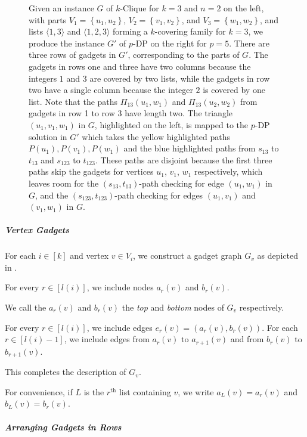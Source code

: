 \documentclass[11pt]{article}
\newcommand{\set}[1]{\left\{#1\right\}}
\theoremstyle{definition}
\begin{document}
\begin{figure}[t]
    \centering
    
    \caption{Given an instance $G$ of \textsf{$k$-Clique} for $k=3$ and $n=2$ on the left, with parts $V_1 = \set{u_1, u_2}$, $V_2 = \set{v_1, v_2}$, and $V_3 = \set{w_1, w_2}$, and lists $\langle 1,3\rangle$ and $\langle 1,2,3\rangle$ 
    forming a $k$-covering family 
    for $k=3$, we produce the instance $G'$ of \textsf{$p$-DP} on the right for $p=5$.
    There are three rows of gadgets in $G'$, corresponding to the  parts of $G$.
    The gadgets in rows one and three have two columns because the  integers $1$ and $3$ are covered by two lists, while the gadgets in row two have 
a single column because the integer $2$ is covered by one list.
Note that the paths $\Pi_{13}(u_1,w_1)$ and $\Pi_{13}(u_2,w_2)$ from gadgets in row 1 to row 3 have length two. 
The triangle $(u_1,v_1,w_1)$ in $G$, highlighted on the left, is mapped to the \textsf{$p$-DP}  solution in $G'$ which takes the yellow highlighted paths $P(u_1), P(v_1), P(w_1)$ and the blue highlighted paths from $s_{13}$ to $t_{13}$ and $s_{123}$ to $t_{123}$.
These paths are disjoint because the first three paths skip the gadgets for vertices $u_1$, $v_1$, $w_1$ respectively, which leaves room for the $(s_{13},t_{13})$-path checking for edge $(u_1,w_1)$ in $G$, and the $(s_{123}, t_{123})$-path checking for edges $(u_1,v_1)$ and $(v_1,w_1)$ in $G$. 
} 
    \label{fig:dp-reduction}
\end{figure}

    \subparagraph{Vertex Gadgets}
    \hfill

    For each $i\in [k]$ and  vertex $v\in V_i$, we construct a gadget graph $G_{v}$ as depicted in .
    
    For every $r\in [l(i)]$, we include nodes $a_r(v)$ and $b_r(v)$.
    
    We call the $a_r(v)$ and $b_r(v)$ the \emph{top} and \emph{bottom} nodes of $G_v$ respectively.
    
    For every $r\in [l(i)]$, we include edges $e_r(v) = (a_r(v), b_r(v))$.
    For each $r\in [l(i)-1]$, we include  edges from $a_r(v)$ to $a_{r+1}(v)$ and from $b_r(v)$ to $b_{r+1}(v)$.
    
    This completes the description of $G_{v}$.
    
    For convenience, if $L$ is the $r^{\text{th}}$ list containing $v$, we write $a_L(v) = a_r(v)$ and $b_L(v) = b_r(v)$.


    \subparagraph{Arranging Gadgets in Rows}\hfill
\end{document}
